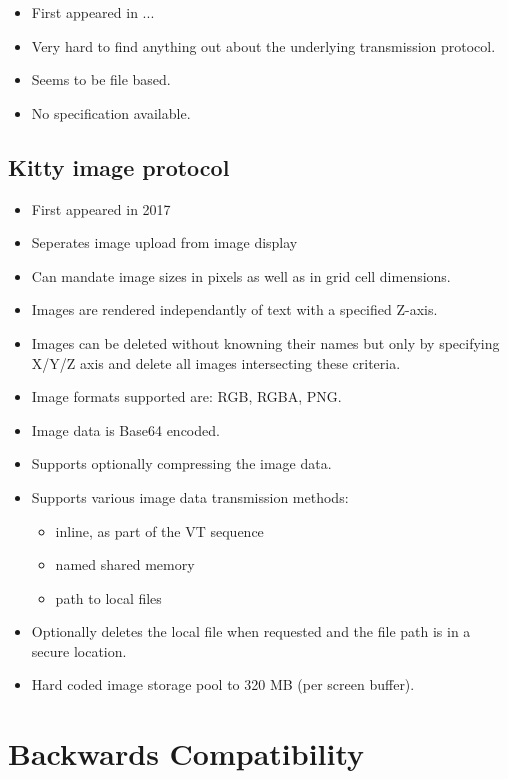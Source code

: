 \documentclass{article}
\begin{document}
\begin{itemize}
    \item First appeared in ... 
    \item Very hard to find anything out about the underlying transmission protocol.
    \item Seems to be file based.
    \item No specification available.
\end{itemize}

\subsection{Kitty image protocol}

\begin{itemize}
    \item First appeared in 2017
    \item Seperates image upload from image display
    \item Can mandate image sizes in pixels as well as in grid cell dimensions.
    \item Images are rendered independantly of text with a specified Z-axis.
    \item Images can be deleted without knowning their names but only by specifying X/Y/Z axis
          and delete all images intersecting these criteria.
    \item Image formats supported are: RGB, RGBA, PNG.
    \item Image data is Base64 encoded.
    \item Supports optionally compressing the image data.
    \item Supports various image data transmission methods:
        \begin{itemize}
            \item inline, as part of the VT sequence
            \item named shared memory
            \item path to local files
        \end{itemize}
    \item Optionally deletes the local file when requested and the file path is in a secure location.
    \item Hard coded image storage pool to 320 MB (per screen buffer).
\end{itemize}

\section{Backwards Compatibility} %
\end{document}
